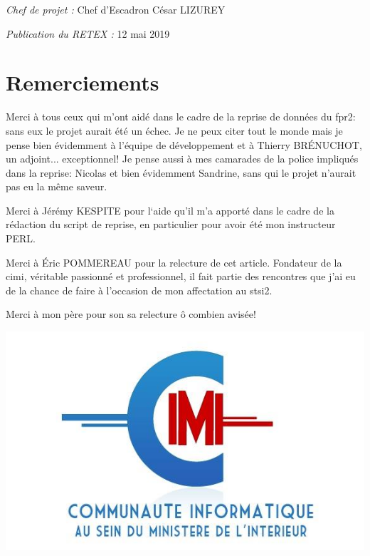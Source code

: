 \documentclass{book}
\begin{document}
\begin{titlepage}
\begin{sffamily}
\begin{center}
    \emph{Chef de projet :} Chef d'Escadron César \textsc{LIZUREY}

    \vfill

    \emph{Publication du RETEX :} 12 mai 2019

  \end{center}
  \end{sffamily}
\end{titlepage}

\thispagestyle{empty}
\chapter*{Remerciements}
Merci à tous ceux qui m'ont aidé dans le cadre de la reprise de données du \gls{fpr2}: sans eux le projet aurait été un échec. Je ne peux citer tout le monde mais je pense bien évidemment à l'équipe de développement et à Thierry BRÉNUCHOT, un adjoint... exceptionnel! Je pense aussi à mes camarades de la police impliqués dans la reprise: Nicolas et bien évidemment Sandrine, sans qui le projet n'aurait pas eu la même saveur.

Merci à Jérémy KESPITE pour l‘aide qu'il m'a apporté dans le cadre de la rédaction du script de reprise, en particulier pour avoir été mon instructeur PERL.

Merci à Éric POMMEREAU pour la relecture de cet article. Fondateur de la \gls{cimi}, véritable passionné et professionnel, il fait partie des rencontres que j'ai eu de la chance de faire à l'occasion de mon affectation au \gls{stsi2}.

Merci à mon père pour son sa relecture ô combien avisée!

\begin{center}
 \includegraphics[scale=0.3]{img/logo-cimi.jpg}
\end{center}
\end{document}
